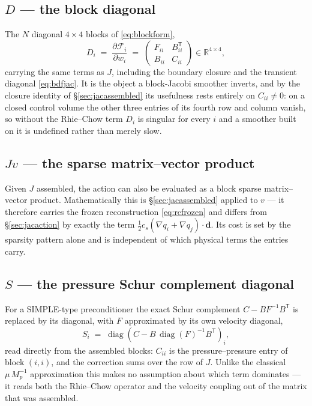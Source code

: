 \documentclass[11pt,a4paper]{article}
\newcommand{\bd}{\mathbf{d}}
\begin{document}
\subsection{$D$ --- the block diagonal}

The $N$ diagonal $4\times4$ blocks of \eqref{eq:blockform},
\begin{equation}
  D_i \;=\; \frac{\partial \mathcal{F}_i}{\partial w_i} \;=\;
  \begin{pmatrix}
    F_{ii} & B^{\mathsf T}_{ii} \\
    B_{ii} & C_{ii}
  \end{pmatrix}
  \in \mathbb{R}^{4\times4} ,
\end{equation}
carrying the same terms as $J$, including the boundary closure and the transient diagonal
\eqref{eq:bdfjac}. It is the object a block-Jacobi smoother inverts, and by the closure
identity of \S\ref{sec:jacassembled} its usefulness rests entirely on $C_{ii} \neq 0$: on a
closed control volume the other three entries of its fourth row and column vanish, so without
the Rhie--Chow term $D_i$ is singular for every $i$ and a smoother built on it is undefined
rather than merely slow.

\subsection{$J v$ --- the sparse matrix--vector product}

Given $J$ assembled, the action can also be evaluated as a block sparse matrix--vector
product. Mathematically this is \S\ref{sec:jacassembled} applied to $v$ --- it therefore
carries the frozen reconstruction \eqref{eq:rcfrozen} and differs from \S\ref{sec:jacaction}
by exactly the term $\tfrac12 c_s (\nabla q_i + \nabla q_j)\cdot\bd$. Its cost is set by the
sparsity pattern alone and is independent of which physical terms the entries carry.

\subsection{$S$ --- the pressure Schur complement diagonal}

For a SIMPLE-type preconditioner the exact Schur complement $C - B F^{-1} B^{\mathsf T}$ is
replaced by its diagonal, with $F$ approximated by its own velocity diagonal,
\begin{equation}
  S_i \;=\; \operatorname{diag}\!\left(
    C - B \, \operatorname{diag}(F)^{-1} B^{\mathsf T}
  \right)_i ,
  \label{eq:schur}
\end{equation}
read directly from the assembled blocks: $C_{ii}$ is the pressure--pressure entry of block
$(i,i)$, and the correction sums over the row of $J$. Unlike the classical $\mu\,M_p^{-1}$
approximation this makes no assumption about which term dominates --- it reads both the
Rhie--Chow operator and the velocity coupling out of the matrix that was assembled.
\end{document}
